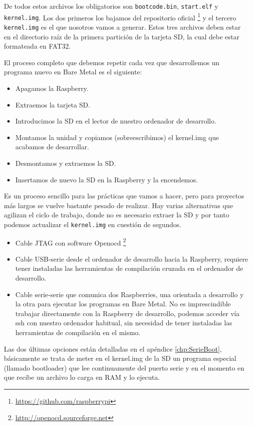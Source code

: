 De todos estos archivos los obligatorios son {\tt bootcode.bin}, {\tt start.elf} y
{\tt kernel.img}. Los dos primeros los bajamos del repositorio oficial
\footnote{\url{https://github.com/raspberrypi}} y el tercero {\tt kernel.img} es el que nosotros
vamos a generar. Estos tres archivos deben estar en el directorio raíz de la primera partición
de la tarjeta SD, la cual debe estar formateada en FAT32.

El proceso completo que debemos repetir cada vez que desarrollemos un programa nuevo
en Bare Metal es el siguiente:

\begin{itemize}
  \item Apagamos la Raspberry.
  \item Extraemos la tarjeta SD.
  \item Introducimos la SD en el lector de nuestro ordenador de desarrollo.
  \item Montamos la unidad y copiamos (sobreescribimos) el kernel.img que acabamos
        de desarrollar.
  \item Desmontamos y extraemos la SD.
  \item Insertamos de nuevo la SD en la Raspberry y la encendemos.
\end{itemize}

Es un proceso sencillo para las prácticas que vamos a hacer, pero para proyectos más largos
se vuelve bastante pesado de realizar. Hay varias alternativas que agilizan el ciclo de
trabajo, donde no es necesario extraer la SD y por tanto podemos actualizar el {\tt kernel.img}
en cuestión de segundos.

\begin{itemize}
  \item Cable JTAG con software Openocd \footnote{\url{http://openocd.sourceforge.net}}
  \item Cable USB-serie desde el ordenador de desarrollo hacia la Raspberry, requiere
        tener instaladas las herramientas de compilación cruzada en el ordenador de desarrollo.
  \item Cable serie-serie que comunica dos Raspberries, una orientada a desarrollo y la otra
        para ejecutar los programas en Bare Metal. No es imprescindible trabajar directamente
        con la Raspberry de desarrollo, podemos acceder vía ssh con nuestro ordenador habitual,
        sin necesidad de tener instaladas las herramientas de compilación en el mismo.
\end{itemize}

Las dos últimas opciones están detalladas en el apéndice \ref{chp:SerieBoot},
básicamente se trata de meter en el kernel.img de la SD un programa especial (llamado
bootloader) que lee continuamente del puerto serie y en el momento en que recibe
un archivo lo carga en RAM y lo ejecuta.

